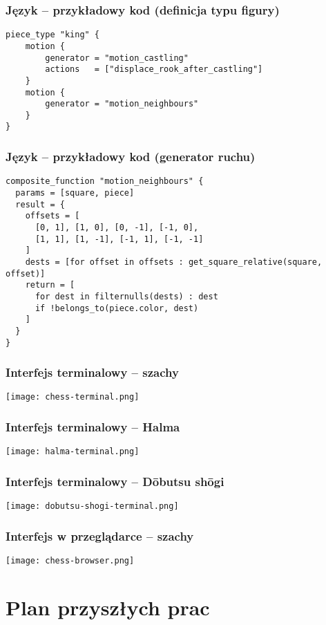 \documentclass{beamer}
\begin{document}
\begin{frame}[fragile]
	\frametitle{Język -- przykładowy kod (definicja typu figury)}

	\begin{lstlisting}
piece_type "king" {
	motion {
		generator = "motion_castling"
		actions   = ["displace_rook_after_castling"]
	}
	motion {
		generator = "motion_neighbours"
	}
}
	\end{lstlisting}
\end{frame}

\begin{frame}[fragile]
	\frametitle{Język -- przykładowy kod (generator ruchu)}

	\begin{lstlisting}
composite_function "motion_neighbours" {
  params = [square, piece]
  result = {
    offsets = [
      [0, 1], [1, 0], [0, -1], [-1, 0],
      [1, 1], [1, -1], [-1, 1], [-1, -1]
    ]
    dests = [for offset in offsets : get_square_relative(square, offset)]
    return = [
      for dest in filternulls(dests) : dest
      if !belongs_to(piece.color, dest)
    ]
  }
}
	\end{lstlisting}
\end{frame}

\begin{frame}
	\frametitle{Interfejs terminalowy -- szachy}
	\centering
	\texttt{[image: chess-terminal.png]}
\end{frame}

\begin{frame}
	\frametitle{Interfejs terminalowy -- Halma}
	\centering
	\texttt{[image: halma-terminal.png]}
\end{frame}

\begin{frame}
	\frametitle{Interfejs terminalowy -- Dōbutsu shōgi}
	\centering
	\texttt{[image: dobutsu-shogi-terminal.png]}
\end{frame}

\begin{frame}
	\frametitle{Interfejs w przeglądarce -- szachy}
	\centering
	\texttt{[image: chess-browser.png]}
\end{frame}

\section{Plan przyszłych prac}
\end{document}
